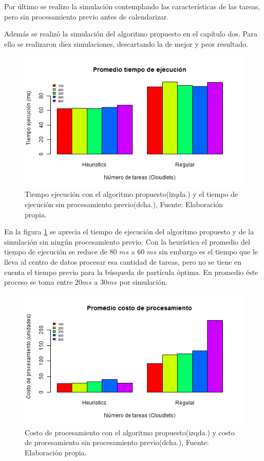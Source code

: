 \documentclass[jou,apacite]{apa6}
\begin{document}
Por último se realizo la simulación contemplando las características de las tareas, pero sin procesamiento previo antes de calendarizar. 

Además se realizó la simulación del algoritmo propuesto en el capítulo dos. Para ello se realizaron diez simulaciones, descartando la de mejor y peor resultado.

\renewcommand\thefigure{\arabic{figure}}
\begin{figure}[h!] 
	\centering
	\includegraphics[scale=0.5]{media/tiempoFinal}
	\caption{Tiempo ejecuci\'on con el algoritmo propuesto(izqda.) y el tiempo de ejecución sin procesamiento previo(dcha.), Fuente: Elaboraci\'on propia.}
	\label{fig:timeF}
\end{figure}

En la figura \ref{fig:timeF} se aprecia el tiempo de ejecución del algoritmo propuesto y de la simulación sin ningún procesamiento previo. Con la heurística el promedio del tiempo de ejecución se reduce de 80 $ms$ a 60 $ms$ sin embargo es el tiempo que le lleva al centro de datos procesar esa cantidad de tareas, pero no se tiene en cuenta el tiempo previo para la búsqueda de partícula óptima. En promedio éste proceso se toma entre 20$ms$ a 30$ms$ por simulación.

\renewcommand\thefigure{\arabic{figure}}
\begin{figure}[h!] 
	\centering
	\includegraphics[scale=0.5]{media/costoFinal}
	\caption{Costo de procesamiento con el algoritmo propuesto(izqda.) y costo de procesamiento sin procesamiento previo(dcha.), Fuente: Elaboraci\'on propia.}
	\label{fig:costF}
\end{figure}
\end{document}
